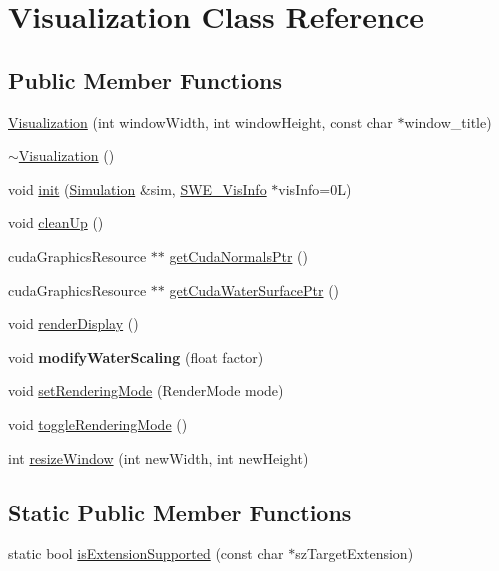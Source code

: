 \hypertarget{classVisualization}{\section{Visualization Class Reference}
\label{classVisualization}
}
\subsection*{Public Member Functions}
\begin{DoxyCompactItemize}
\item 
\hyperlink{classVisualization_af3e258903a7c4b52a12cfbeb3332aed8}{Visualization} (int window\-Width, int window\-Height, const char $\ast$window\-\_\-title)
\item 
\hyperlink{classVisualization_a1b3dc8c07a781aaf8f4cbe95031e191c}{$\sim$\-Visualization} ()
\item 
void \hyperlink{classVisualization_ad2ba8e6ef021127f111419c6c2605842}{init} (\hyperlink{classSimulation}{Simulation} \&sim, \hyperlink{classSWE__VisInfo}{S\-W\-E\-\_\-\-Vis\-Info} $\ast$vis\-Info=0\-L)
\item 
void \hyperlink{classVisualization_a9f636583bc52bd7b5180eff2751fbb70}{clean\-Up} ()
\item 
cuda\-Graphics\-Resource $\ast$$\ast$ \hyperlink{classVisualization_a0c618934d4dc368e4f400099c9aa2e84}{get\-Cuda\-Normals\-Ptr} ()
\item 
cuda\-Graphics\-Resource $\ast$$\ast$ \hyperlink{classVisualization_aa19e824f46baf01a66b1d991107f26f2}{get\-Cuda\-Water\-Surface\-Ptr} ()
\item 
void \hyperlink{classVisualization_acce7d4076eb313acaa526741428b53cb}{render\-Display} ()
\item 
\hypertarget{classVisualization_a8c985ef294e7d35ab65257c30f757807}{void {\bfseries modify\-Water\-Scaling} (float factor)}\label{classVisualization_a8c985ef294e7d35ab65257c30f757807}

\item 
void \hyperlink{classVisualization_ae608b97c9e82e78b212cc1cb2b744c5d}{set\-Rendering\-Mode} (Render\-Mode mode)
\item 
void \hyperlink{classVisualization_a39038b57b96b4718c2c06710100d6317}{toggle\-Rendering\-Mode} ()
\item 
int \hyperlink{classVisualization_a0bb75d211b64d94fddf5e17b80c3f165}{resize\-Window} (int new\-Width, int new\-Height)
\end{DoxyCompactItemize}
\subsection*{Static Public Member Functions}
\begin{DoxyCompactItemize}
\item 
static bool \hyperlink{classVisualization_a4d2ba4c344b5c6aca5410123281ddbc9}{is\-Extension\-Supported} (const char $\ast$sz\-Target\-Extension)
\end{DoxyCompactItemize}
